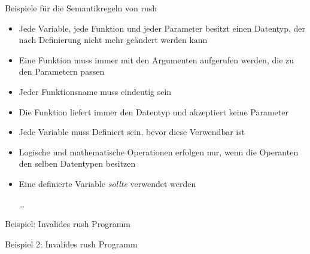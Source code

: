 \begin{frame}{Beispiele für die Semantikregeln von rush}
	\begin{itemize}
		\item Jede Variable, jede Funktion und jeder Parameter besitzt einen Datentyp, der nach Definierung nicht mehr geändert werden kann
		\item Eine Funktion muss immer mit den Argumenten aufgerufen werden, die zu den Parametern passen
		\item Jeder Funktionsname muss eindeutig sein
		\item Die  Funktion liefert immer den \qVerb{()} Datentyp und akzeptiert keine Parameter
		\item Jede Variable muss Definiert sein, bevor diese Verwendbar ist
		\item Logische und mathematische Operationen erfolgen nur, wenn die Operanten den selben Datentypen besitzen
		\item Eine definierte Variable \emph{sollte} verwendet werden
		\item[\ldots]
	\end{itemize}
\end{frame}

\begin{frame}{Beispiel: Invalides rush Programm}
	\begin{minipage}{.5\textwidth}
	\end{minipage}%
	\begin{minipage}{.5\textwidth}
	\end{minipage}
\end{frame}

\begin{frame}{Beispiel 2: Invalides rush Programm}
	\begin{minipage}{.5\textwidth}
	\end{minipage}%
	\begin{minipage}{.5\textwidth}
	\end{minipage}
\end{frame}


